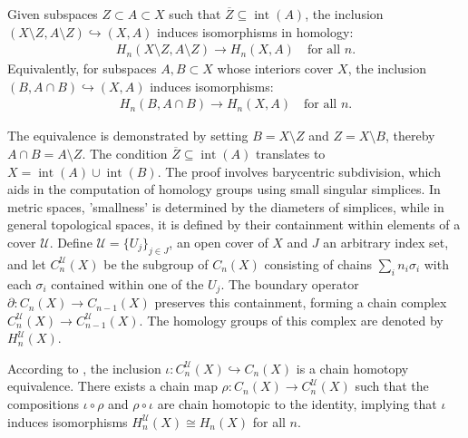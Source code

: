 \begin{theorem}
	{\cite[\S 2.20]{hatcher2005algebraic} \label{excisiontheorem} Given subspaces $Z \subset A \subset X$ such that $\overline{Z}\subseteq \operatorname{int}(A)$, the inclusion $(X\setminus Z, A\setminus Z) \hookrightarrow (X, A)$ induces isomorphisms in homology}:
	\begin{align}
		H_{n}(X\setminus Z, A\setminus Z) \to H_{n}(X, A) \quad \text{for all }n. 
	\end{align}
	Equivalently, for subspaces $A, B \subset X$ whose interiors cover $X$, the
	inclusion $(B, A \cap B) \hookrightarrow (X, A)$ induces isomorphisms:
	\begin{align}
		H_{n}(B, A \cap B) \to H_{n}(X, A) \quad \text{for all }n. 
	\end{align}
\end{theorem}

The equivalence is demonstrated by setting \( B = X \setminus Z \) and \( Z = X \setminus B \), thereby \( A \cap B = A \setminus Z \). The condition \( \overline{Z} \subseteq \operatorname{int}(A) \) translates to \( X = \operatorname{int}(A) \cup \operatorname{int}(B) \). The proof involves barycentric subdivision, which aids in the computation of homology groups using small singular simplices. In metric spaces, 'smallness' is determined by the diameters of simplices, while in general topological spaces, it is defined by their containment within elements of a cover \( \mathcal{U} \). Define \( \mathcal{U} = \{U_{j}\}_{j \in J} \), an open cover of \( X \) and $J$ an arbitrary index set, and let \( C^{\mathcal{U}}_{n}(X) \) be the subgroup of \( C_{n}(X) \) consisting of chains \( \sum_{i} n_{i} \sigma_{i} \) with each \( \sigma_{i} \) contained within one of the \( U_{j} \). The boundary operator \( \partial: C_{n}(X) \to C_{n-1}(X) \) preserves this containment, forming a chain complex \( C^{\mathcal{U}}_{n}(X) \to C^{\mathcal{U}}_{n-1}(X) \). The homology groups of this complex are denoted by \( H^{\mathcal{U}}_{n}(X) \).

\begin{proposition}
	According to \cite[\S 2.21]{hatcher2005algebraic}, the inclusion \( \iota : C^{\mathcal{U}}_n(X) \hookrightarrow C_n(X) \) is a chain homotopy equivalence. There exists a chain map \( \rho : C_n(X) \to C^{\mathcal{U}}_n(X) \) such that the compositions \( \iota \circ \rho \) and \( \rho \circ \iota \) are chain homotopic to the identity, implying that \( \iota \) induces isomorphisms \( H^{\mathcal{U}}_n(X) \cong H_n(X) \) for all \( n \).
\end{proposition}

